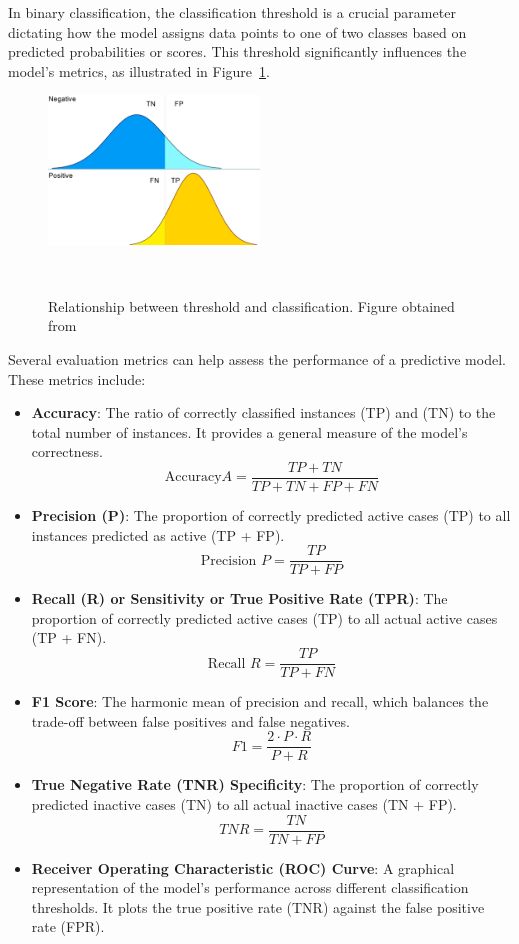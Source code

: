 In binary classification, the classification threshold is a crucial parameter dictating how the model assigns data points to one of two classes based on predicted probabilities or scores. This threshold significantly influences the model's metrics, as illustrated in Figure~\ref{fig:classification_threshold}.
\begin{figure} 
  \centering
  \includegraphics[width=0.5\textwidth]{figures/classification_threshold.png}
  \caption{Relationship between threshold and classification. Figure obtained from~\cite{wicklin2020}}
~\label{fig:classification_threshold}
\end{figure}

Several evaluation metrics can help assess the performance of a predictive model. These metrics include:

\begin{itemize}
  \item \textbf{Accuracy}: The ratio of correctly classified instances (TP) and (TN) to the total number of instances. It provides a general measure of the model's correctness.
  \[ \text{Accuracy}  A = \frac{TP + TN}{TP + TN + FP + FN} \]

  \item \textbf{Precision (P)}: The proportion of correctly predicted active cases (TP) to all instances predicted as active (TP + FP). 
  \[ \text{Precision } P = \frac{TP}{TP + FP} \]

  \item \textbf{Recall (R) or Sensitivity or True Positive Rate (TPR)}: The proportion of correctly predicted active cases (TP) to all actual active cases (TP + FN).
  \[ \text{Recall } R = \frac{TP}{TP + FN} \]

  \item \textbf{F1 Score}: The harmonic mean of precision and recall, which balances the trade-off between false positives and false negatives.
  \[ F1 = \frac{2 \cdot P \cdot R}{P + R} \]

  \item \textbf{True Negative Rate (TNR) Specificity}: The proportion of correctly predicted inactive cases (TN) to all actual inactive cases (TN + FP).
  \[ TNR = \frac{TN}{TN + FP} \]

  \item \textbf{Receiver Operating Characteristic (ROC) Curve}: A graphical representation of the model's performance across different classification thresholds. It plots the true positive rate (TNR) against the false positive rate (FPR).
  
\end{itemize}


